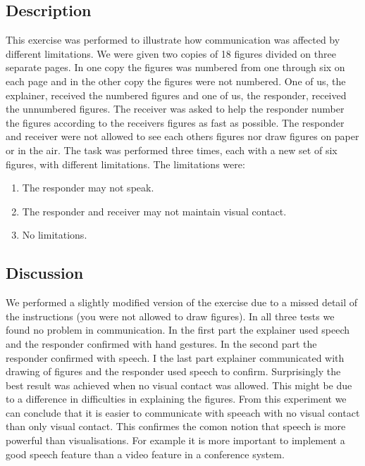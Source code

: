 \documentclass[10pt, a4paper]{article}
\begin{document}
\subsection{Description}
This exercise was performed to illustrate how communication was affected by different limitations. We were given two copies of 18 figures divided on three separate pages. In one copy the figures was numbered from one through six on each page and in the other copy the figures were not numbered. One of us, the explainer, received the numbered figures and one of us, the responder, received the unnumbered figures. The receiver was asked to help the responder number the figures according to the receivers figures as fast as possible. The responder and receiver were not allowed to see each others figures nor draw figures on paper or in the air. The task was performed three times, each with a new set of six figures, with different limitations.
The limitations were:
\begin{enumerate}
\item The responder may not speak.
\item The responder and receiver may not maintain visual contact.
\item No limitations.
\end{enumerate}

\subsection{Discussion}
We performed a slightly modified version of the exercise due to a missed detail of the instructions (you were not allowed to draw figures). In all three tests we found no problem in communication. In the first part the explainer used speech and the responder confirmed with hand gestures. In the second part the responder confirmed with speech. I the last part explainer communicated with drawing of figures and the responder used speech to confirm. Surprisingly the best result was achieved when no visual contact was allowed. This might be due to a difference in difficulties in explaining the figures. From this experiment we can conclude that it is easier to communicate with speeach with no visual contact than only visual contact. This confirmes the comon notion that speech is more powerful than visualisations. For example it is more important to implement a good speech feature than a video feature in a conference system.

%
%
\end{document}
